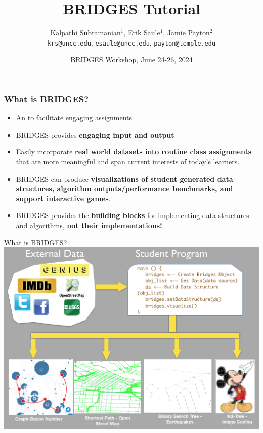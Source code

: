 \documentclass[aspectratio=169]{beamer}
\title{BRIDGES Tutorial}
\subtitle{}
\author{Kalpathi Subramanian$^1$, Erik Saule$^1$, Jamie Payton$^2$\\\texttt{krs@uncc.edu}, \texttt{esaule@uncc.edu}, \texttt{payton@temple.edu} }
\institute{$^1$The University of North Carolina at Charlotte\\$^2$Temple University}
\date{BRIDGES Workshop, June 24-26, 2024}
\begin{document}
\begin{frame}
\titlepage
\end{frame}



\begin{frame}
  \frametitle{What is BRIDGES?}
\begin{itemize}
	\item An  to facilitate engaging assignments
	\item BRIDGES provides \textbf{engaging input and output}
	\item Easily incorporate \textbf{real world datasets into routine
		class assignments} that are more meaningful and span
		current interests of today's learners.
	\item BRIDGES can produce \textbf{visualizations of student generated
		data structures, algorithm outputs/performance benchmarks, 
		and support interactive games}.
	\item BRIDGES provides the \textbf{building blocks} for implementing
		data structures and algorithms,  \textbf{not their implementations!}
\end{itemize}
\end{frame}
\begin{frame}{What is BRIDGES?}
  \center\includegraphics[width=.7\linewidth]{fig/bridges-overview.png}
\end{frame}
\end{document}
